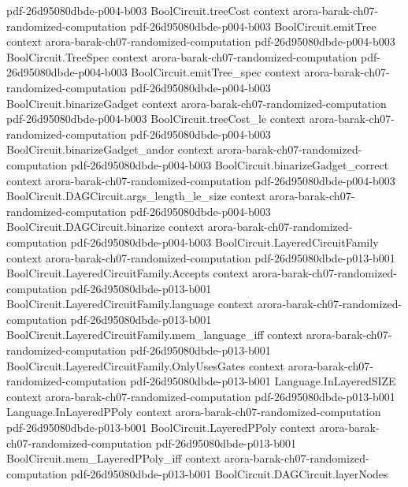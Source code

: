 \begin{theorem}
  {pdf-26d95080dbde-p004-b003}
\proofstep
  {BoolCircuit.treeCost}
  {context}
  {arora-barak-ch07-randomized-computation}
  {pdf-26d95080dbde-p004-b003}
\proofstep
  {BoolCircuit.emitTree}
  {context}
  {arora-barak-ch07-randomized-computation}
  {pdf-26d95080dbde-p004-b003}
\proofstep
  {BoolCircuit.TreeSpec}
  {context}
  {arora-barak-ch07-randomized-computation}
  {pdf-26d95080dbde-p004-b003}
\proofstep
  {BoolCircuit.emitTree_spec}
  {context}
  {arora-barak-ch07-randomized-computation}
  {pdf-26d95080dbde-p004-b003}
\proofstep
  {BoolCircuit.binarizeGadget}
  {context}
  {arora-barak-ch07-randomized-computation}
  {pdf-26d95080dbde-p004-b003}
\proofstep
  {BoolCircuit.treeCost_le}
  {context}
  {arora-barak-ch07-randomized-computation}
  {pdf-26d95080dbde-p004-b003}
\proofstep
  {BoolCircuit.binarizeGadget_andor}
  {context}
  {arora-barak-ch07-randomized-computation}
  {pdf-26d95080dbde-p004-b003}
\proofstep
  {BoolCircuit.binarizeGadget_correct}
  {context}
  {arora-barak-ch07-randomized-computation}
  {pdf-26d95080dbde-p004-b003}
\proofstep
  {BoolCircuit.DAGCircuit.args_length_le_size}
  {context}
  {arora-barak-ch07-randomized-computation}
  {pdf-26d95080dbde-p004-b003}
\proofstep
  {BoolCircuit.DAGCircuit.binarize}
  {context}
  {arora-barak-ch07-randomized-computation}
  {pdf-26d95080dbde-p004-b003}
\proofstep
  {BoolCircuit.LayeredCircuitFamily}
  {context}
  {arora-barak-ch07-randomized-computation}
  {pdf-26d95080dbde-p013-b001}
\proofstep
  {BoolCircuit.LayeredCircuitFamily.Accepts}
  {context}
  {arora-barak-ch07-randomized-computation}
  {pdf-26d95080dbde-p013-b001}
\proofstep
  {BoolCircuit.LayeredCircuitFamily.language}
  {context}
  {arora-barak-ch07-randomized-computation}
  {pdf-26d95080dbde-p013-b001}
\proofstep
  {BoolCircuit.LayeredCircuitFamily.mem_language_iff}
  {context}
  {arora-barak-ch07-randomized-computation}
  {pdf-26d95080dbde-p013-b001}
\proofstep
  {BoolCircuit.LayeredCircuitFamily.OnlyUsesGates}
  {context}
  {arora-barak-ch07-randomized-computation}
  {pdf-26d95080dbde-p013-b001}
\proofstep
  {Language.InLayeredSIZE}
  {context}
  {arora-barak-ch07-randomized-computation}
  {pdf-26d95080dbde-p013-b001}
\proofstep
  {Language.InLayeredPPoly}
  {context}
  {arora-barak-ch07-randomized-computation}
  {pdf-26d95080dbde-p013-b001}
\proofstep
  {BoolCircuit.LayeredPPoly}
  {context}
  {arora-barak-ch07-randomized-computation}
  {pdf-26d95080dbde-p013-b001}
\proofstep
  {BoolCircuit.mem_LayeredPPoly_iff}
  {context}
  {arora-barak-ch07-randomized-computation}
  {pdf-26d95080dbde-p013-b001}
\proofstep
  {BoolCircuit.DAGCircuit.layerNodes}

\end{theorem}
